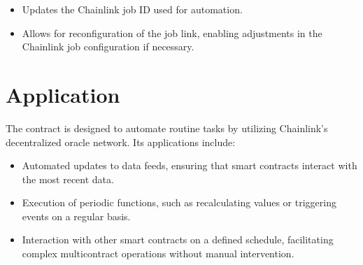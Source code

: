 \documentclass[a4paper,10pt,english]{sphinxmanual}
\begin{document}
\begin{itemize}
\begin{sphinxVerbatim}[commandchars=\\\{\}]
\end{sphinxVerbatim}
\begin{itemize}
\item {} 
\sphinxAtStartPar
{} Updates the Chainlink job ID used for automation.

\item {} 
\sphinxAtStartPar
{} Allows for reconfiguration of the job link, enabling adjustments in the Chainlink job configuration if necessary.

\end{itemize}

\end{itemize}


\section{Application}
\label{\detokenize{docs_chainlink_automation_contract:application}}
\sphinxAtStartPar
The  contract is designed to automate routine tasks by utilizing Chainlink’s decentralized oracle network. Its applications include:
\begin{itemize}
\item {} 
\sphinxAtStartPar
{} Automated updates to data feeds, ensuring that smart contracts interact with the most recent data.

\item {} 
\sphinxAtStartPar
{} Execution of periodic functions, such as recalculating values or triggering events on a regular basis.

\item {} 
\sphinxAtStartPar
{} Interaction with other smart contracts on a defined schedule, facilitating complex multi\sphinxhyphen{}contract operations without manual intervention.

\end{itemize}
\end{document}
